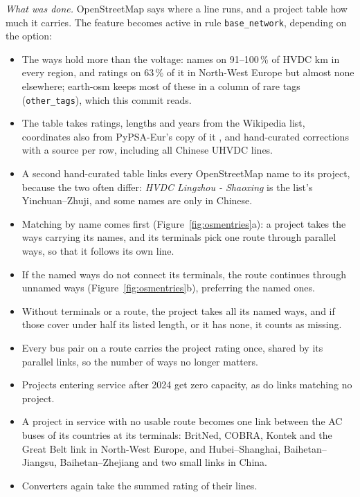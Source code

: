 \textit{What was done.}
OpenStreetMap says where a line runs, and a project table how much it carries.
The feature becomes active in rule \texttt{base\_network}, depending on the option:
\begin{itemize}[nosep,leftmargin=*]
  \item The ways hold more than the voltage: names on 91--100\,\% of HVDC km in every region, and ratings on 63\,\% of it in North-West Europe but almost none elsewhere; earth-osm keeps most of these in a column of rare tags (\texttt{other\_tags}), which this commit reads.
  \item The table takes ratings, lengths and years from the Wikipedia list, coordinates also from PyPSA-Eur's copy of it \citep{horsch2018pypsa}, and hand-curated corrections with a source per row, including all Chinese UHVDC lines.
  \item A second hand-curated table links every OpenStreetMap name to its project, because the two often differ: \emph{HVDC Lingzhou - Shaoxing} is the list's Yinchuan--Zhuji, and some names are only in Chinese.
  \item Matching by name comes first (Figure~\ref{fig:osmentries}a): a project takes the ways carrying its names, and its terminals pick one route through parallel ways, so that it follows its own line.
  \item If the named ways do not connect its terminals, the route continues through unnamed ways (Figure~\ref{fig:osmentries}b), preferring the named ones.
  \item Without terminals or a route, the project takes all its named ways, and if those cover under half its listed length, or it has none, it counts as missing.
  \item Every bus pair on a route carries the project rating once, shared by its parallel links, so the number of ways no longer matters.
  \item Projects entering service after 2024 get zero capacity, as do links matching no project.
  \item A project in service with no usable route becomes one link between the AC buses of its countries at its terminals: BritNed, COBRA, Kontek and the Great Belt link in North-West Europe, and Hubei--Shanghai, Baihetan--Jiangsu, Baihetan--Zhejiang and two small links in China.
  \item Converters again take the summed rating of their lines.
\end{itemize}

